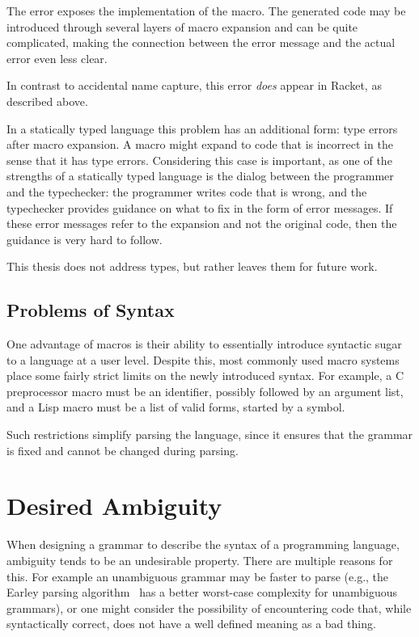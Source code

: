 \documentclass{kththesis}
\begin{document}
The error exposes the implementation of the macro. The generated code may be introduced through several layers of macro expansion and can be quite complicated, making the connection between the error message and the actual error even less clear.

In contrast to accidental name capture, this error \emph{does} appear in Racket, as described above.

In a statically typed language this problem has an additional form: type errors after macro expansion. A macro might expand to code that is incorrect in the sense that it has type errors. Considering this case is important, as one of the strengths of a statically typed language is the dialog between the programmer and the typechecker: the programmer writes code that is wrong, and the typechecker provides guidance on what to fix in the form of error messages. If these error messages refer to the expansion and not the original code, then the guidance is very hard to follow.

This thesis does not address types, but rather leaves them for future work.

\subsection{Problems of Syntax} \label{sec:problem-syntax}

One advantage of macros is their ability to essentially introduce syntactic sugar to a language at a user level. Despite this, most commonly used macro systems place some fairly strict limits on the newly introduced syntax. For example, a C preprocessor macro must be an identifier, possibly followed by an argument list, and a Lisp macro must be a list of valid forms, started by a symbol.

Such restrictions simplify parsing the language, since it ensures that the grammar is fixed and cannot be changed during parsing.

\section{Desired Ambiguity} \label{sec:desired-ambiguity}


When designing a grammar to describe the syntax of a programming language, ambiguity tends to be an undesirable property. There are multiple reasons for this. For example an unambiguous grammar may be faster to parse (e.g., the Earley parsing algorithm~\cite{Earley1970An-Efficient-Co} has a better worst-case complexity for unambiguous grammars), or one might consider the possibility of encountering code that, while syntactically correct, does not have a well defined meaning as a bad thing.
\end{document}
